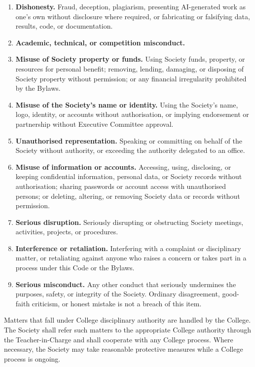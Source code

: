 \documentclass[a4paper]{article}
\begin{document}
\begin{enumerate}
  \item \textbf{Dishonesty.} Fraud, deception, plagiarism, presenting
    AI-generated work as one's own without disclosure where required, or
    fabricating or falsifying data, results, code, or documentation.
  \item \textbf{Academic, technical, or competition misconduct.}
  \item \textbf{Misuse of Society property or funds.} Using Society funds,
    property, or resources for personal benefit; removing, lending,
    damaging, or disposing of Society property without permission; or any
    financial irregularity prohibited by the Bylaws.
  \item \textbf{Misuse of the Society's name or identity.} Using the
    Society's name, logo, identity, or accounts without authorisation, or
    implying endorsement or partnership without Executive Committee
    approval.
  \item \textbf{Unauthorised representation.} Speaking or committing on
    behalf of the Society without authority, or exceeding the authority
    delegated to an office.
  \item \textbf{Misuse of information or accounts.} Accessing, using,
    disclosing, or keeping confidential information, personal data, or
    Society records without authorisation; sharing passwords or account
    access with unauthorised persons; or deleting, altering, or removing
    Society data or records without permission.
  \item \textbf{Serious disruption.} Seriously disrupting or obstructing
    Society meetings, activities, projects, or procedures.
  \item \textbf{Interference or retaliation.} Interfering with a complaint
    or disciplinary matter, or retaliating against anyone who raises a
    concern or takes part in a process under this Code or the Bylaws.
  \item \textbf{Serious misconduct.} Any other conduct that seriously
    undermines the purposes, safety, or integrity of the Society.
    Ordinary disagreement, good-faith criticism, or honest mistake is not
    a breach of this item.
\end{enumerate}

Matters that fall under College disciplinary authority are handled by the
College. The Society shall refer such matters to the appropriate College
authority through the Teacher-in-Charge and shall cooperate with any
College process. Where necessary, the Society may take reasonable
protective measures while a College process is ongoing.
\end{document}
